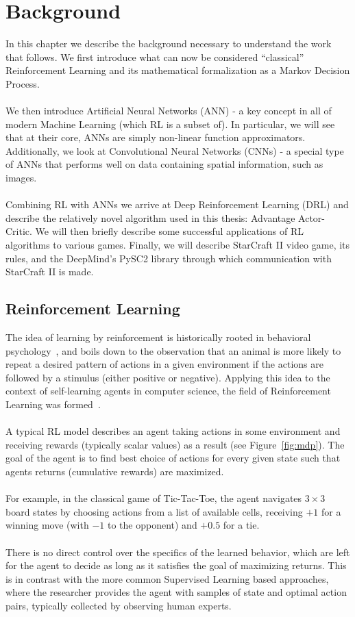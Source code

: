 \chapter{Background}

In this chapter we describe the background necessary to understand the work that follows. We first introduce what can now be considered “classical” Reinforcement Learning and its mathematical formalization as a Markov Decision Process. 
\\\\
We then introduce Artificial Neural Networks (ANN) - a key concept in all of modern Machine Learning (which RL is a subset of). In particular, we will see that at their core, ANNs are simply non-linear function approximators. Additionally, we look at Convolutional Neural Networks (CNNs) - a special type of ANNs that performs well on data containing spatial information, such as images. 
\\\\
Combining RL with ANNs we arrive at Deep Reinforcement Learning (DRL) and describe the relatively novel algorithm used in this thesis: Advantage Actor-Critic. We will then briefly describe some successful applications of RL algorithms to various games. Finally, we will describe StarCraft II video game, its rules, and the DeepMind’s PySC2 library through which communication with StarCraft II is made.

\section{Reinforcement Learning}

The idea of learning by reinforcement is historically rooted in behavioral psychology~\cite{Thorndike1898}, and boils down to the observation that an animal is more likely to repeat a desired pattern of actions in a given environment if the actions are followed by a stimulus (either positive or negative). Applying this idea to the context of self-learning agents in computer science, the field of Reinforcement Learning was formed~\cite{Samuel1959}.
\\\\
A typical RL model describes an agent taking actions in some environment and receiving rewards (typically scalar values) as a result (see Figure~\ref{fig:mdp}). The goal of the agent is to find best choice of actions for every given state such that agents returns (cumulative rewards) are maximized.
\\\\
For example, in the classical game of Tic-Tac-Toe, the agent navigates $3\times3$ board states by choosing actions from a list of available cells, receiving $+1$ for a winning move (with $-1$ to the opponent) and $+0.5$ for a tie.
\\\\
There is no direct control over the specifics of the learned behavior, which are left for the agent to decide as long as it satisfies the goal of maximizing returns. This is in contrast with the more common Supervised Learning based approaches, where the researcher provides the agent with samples of state and optimal action pairs, typically collected by observing human experts. 

